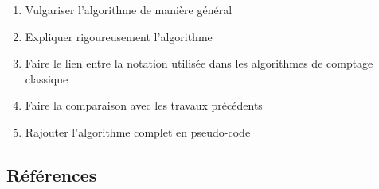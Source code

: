 \begin{enumerate}
    \item Vulgariser l'algorithme de manière général
    \item Expliquer rigoureusement l'algorithme
    \item Faire le lien entre la notation utilisée dans les algorithmes de comptage classique
    \item Faire la comparaison avec les travaux précédents
    \item Rajouter l'algorithme complet en pseudo-code
\end{enumerate}

\subsection*{Références}



